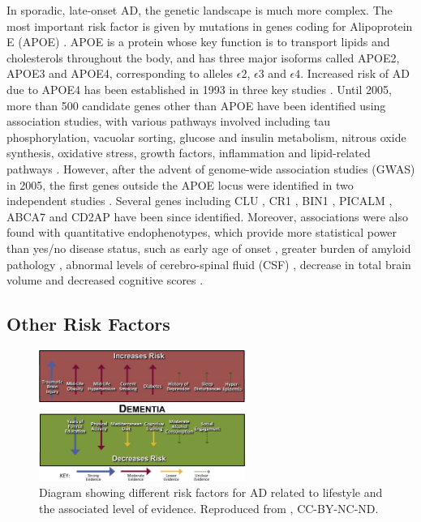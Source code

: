In sporadic, late-onset AD, the genetic landscape is much more complex. The most important risk factor is given by mutations in genes coding for Alipoprotein E (APOE) \cite{chouraki2014genetics}.  APOE is a protein whose key function is to transport lipids and cholesterols throughout the body, and has three major isoforms called APOE2, APOE3 and APOE4, corresponding to alleles $\epsilon2$, $\epsilon3$ and $\epsilon4$. Increased risk of AD due to APOE4 has been established in 1993 in three key studies \cite{strittmatter1993apolipoprotein, saunders1993association, corder1993gene}. Until 2005, more than 500 candidate genes other than APOE have been identified using association studies, with various pathways involved including tau phosphorylation, vacuolar sorting, glucose and insulin metabolism, nitrous oxide synthesis, oxidative stress, growth factors, inflammation and lipid-related pathways \cite{chouraki2014genetics}.  However, after the advent of genome-wide association studies (GWAS) in 2005, the first genes outside the APOE locus were identified in two independent studies \cite{harold2009genome,lambert2009genome}. Several genes including CLU \cite{harold2009genome,lambert2009genome}, CR1 \cite{lambert2009genome}, BIN1 \cite{seshadri2010genome}, PICALM \cite{harold2009genome}, ABCA7 \cite{hollingworth2011common} and CD2AP \cite{naj2011common} have been since identified. Moreover, associations were also found with quantitative endophenotypes, which provide more statistical power than yes/no disease status, such as early age of onset \cite{thambisetty2013alzheimerA, thambisetty2013alzheimerB}, greater burden of amyloid pathology \cite{biffi2012genetic,chibnik2011cr1}, abnormal levels of cerebro-spinal fluid (CSF) \cite{elias2013genetic, kauwe2011fine}, decrease in total brain volume \cite{bralten2011cr1, furney2011genome} and decreased cognitive scores \cite{barral2012genotype,chibnik2011cr1,mengel2013clu}.


\subsection{Other Risk Factors}
\label{sec:bckRisFac}

\begin{figure}
\centering
\includegraphics[width=0.6\textwidth]{images/adRiskFactors}
\caption[Different risk factors for AD related to lifestyle and the associated level of evidence]{Diagram showing different risk factors for AD related to lifestyle and the associated level of evidence. Reproduced from \cite{baumgart2015summary}, CC-BY-NC-ND.}
\label{fig:bckAdRiskFactors}
\end{figure}

